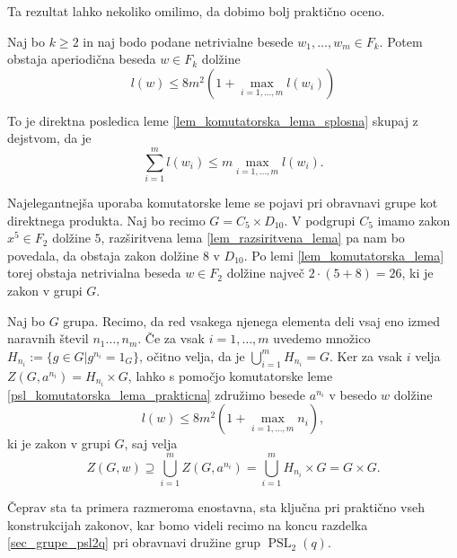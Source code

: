 Ta rezultat lahko nekoliko omilimo, da dobimo bolj praktično oceno.
\begin{posledica}
\label{psl_komutatorska_lema_prakticna}
Naj bo $k \ge 2$ in naj bodo podane netrivialne besede $w_1, \ldots, w_m \in  F_k$. Potem obstaja aperiodična beseda $w \in  F_k$ dolžine \begin{equation*}
l(w) \le 8m^2 \left(1 +  \max_{i = 1, \ldots, m} l(w_i) \right)
\end{equation*}      
\end{posledica}
\begin{dokaz}
    To je direktna posledica leme \ref{lem_komutatorska_lema_splosna} skupaj z dejstvom, da je \begin{equation*}
    \sum_{i = 1}^{m} l(w_{i}) \le m \max_{i = 1, \ldots, m} l(w_i).
    \end{equation*}  
\end{dokaz}


\begin{primer}\label{prm_komutatorska_produkt_elementov}
Najelegantnejša uporaba komutatorske leme se pojavi pri obravnavi grupe kot direktnega produkta. Naj bo recimo $G = C_5 \times D_{10}$. 
V podgrupi $C_5$ imamo zakon $x^{5} \in F_2$ dolžine $5$, razširitvena lema \ref{lem_razsiritvena_lema} pa nam bo povedala, da obstaja zakon dolžine $8$ v $D_{10}$. Po lemi \ref{lem_komutatorska_lema} torej obstaja
netrivialna beseda $w \in F_2$ dolžine največ $2 \cdot (5 + 8) = 26$, ki je zakon v grupi $G$.
\end{primer}
\begin{primer}\label{prm_komutatorska_redi_elementov}
Naj bo $G$ grupa. Recimo, da red vsakega njenega elementa deli vsaj eno izmed naravnih števil $n_1 \ldots, n_m$. Če za vsak $i = 1, \ldots , m$ uvedemo množico $H_{n_i} := \{ g \in G \vert g^{n_i} = 1_G \}$,
očitno velja, da je $\bigcup_{i = 1}^m H_{n_i} = G$. Ker za vsak $i$ velja $Z(G, a^{n_i}) = H_{n_i} \times G$, lahko s pomočjo komutatorske leme \ref{psl_komutatorska_lema_prakticna} združimo besede $a^{n_i}$ v besedo $w$ dolžine
\begin{equation*}
    l(w) \le 8 m^2 \left( 1 + \max_{i = 1, \ldots, m} n_i \right),
\end{equation*}
ki je zakon v grupi $G$, saj velja \begin{equation*}
    Z(G, w) \supseteq \bigcup_{i = 1}^m Z(G, a^{n_i}) =  \bigcup_{i = 1}^m H_{n_i} \times G = G \times G.
\end{equation*}\end{primer}
Čeprav sta ta primera razmeroma enostavna, sta ključna pri praktično vseh konstrukcijah zakonov, kar bomo videli recimo na koncu razdelka \ref{sec_grupe_psl2q} pri obravnavi družine grup $\operatorname{PSL}_2(q)$. 


